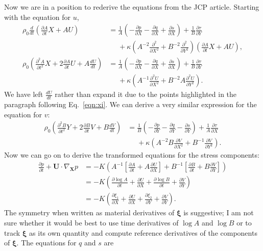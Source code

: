 \documentclass[11pt]{article}
\newcommand{\p}{\partial}
\newcommand{\bxi}{\boldsymbol\xi}
\newcommand{\bU}{\mathbf{U}}
\newcommand{\bX}{\mathbf{X}}
\begin{document}
Now we are in a position to rederive the equations from the JCP article. Starting with the equation for $u$,
\begin{align}
  \rho_0 \frac{d}{dt}\left(\frac{\p A}{\p t}X + A U\right) &= \frac{1}{A}\left(-\frac{\p p}{\p X} - \frac{\p q}{\p X} + \frac{\p s}{\p X} \right) + \frac{1}{B}\frac{\p \tau}{\p Y} \nonumber \\
    &\phantom{=} + \kappa\left(A^{-2}\frac{\p^2}{\p X^2} + B^{-2}\frac{\p^2}{\p Y^2}\right)\left(\frac{\p A}{\p t} X + A U\right), \label{eqn:u}\\
    \rho_0 \left(\frac{\p^2 A}{\p t^2}X + 2\frac{\p A}{\p t}U + A\frac{d U}{dt}\right) &= \frac{1}{A}\left(-\frac{\p p}{\p X} - \frac{\p q}{\p X} + \frac{\p s}{\p X} \right) + \frac{1}{B}\frac{\p \tau}{\p Y} \nonumber \\
    &\phantom{=} + \kappa\left(A^{-1}\frac{\p^2 U}{\p X^2} + B^{-2}A\frac{\p^2 U}{\p Y^2}\right).
\end{align}
We have left $\frac{d U}{dt}$ rather than expand it due to the points highlighted in the paragraph following Eq.~\ref{eqn:xi}. We can derive a very similar expression for the equation for $v$:
\begin{align}
  \rho_0 \left(\frac{\p^2 B}{\p t^2}Y + 2\frac{\p B}{\p t}V + B\frac{d V}{dt}\right) &= \frac{1}{B}\left(-\frac{\p p}{\p Y} - \frac{\p q}{\p Y} - \frac{\p s}{\p Y}\right) + \frac{1}{A}\frac{\p \tau}{\p X} \nonumber \\
    &\phantom{=} + \kappa \left(A^{-2}B\frac{\p V}{\p X^2} + B^{-1}\frac{\p V}{\p Y^2}\right). \label{eqn:v}
\end{align}
Now we can go on to derive the transformed equations for the stress components:
\begin{align}
    \frac{\p p}{\p t} + \bU\cdot\nabla_\bX p &= -K\left(A^{-1}\left[\frac{\p A}{\p t} + A\frac{\p U}{\p X}\right] + B^{-1}\left[\frac{\p B}{\p t} + B\frac{\p V}{\p Y}\right]\right)\nonumber\\
    &= -K \left(\frac{\p \log A}{\p t} + \frac{\p U}{\p X} + \frac{\p \log B}{\p t} + \frac{\p V}{\p Y}\right)\nonumber\\
    &= -K \left(\frac{\p \xi_1}{\p X} + \frac{\p U}{\p X} + \frac{\p \xi_2}{\p Y} + \frac{\p V}{\p Y}\right).
    \label{eqn:p}
\end{align}
The symmetry when written as material derivatives of $\bxi$ is suggestive; I am not sure whether it would be best to use time derivatives of $\log A$ and $\log B$ or to track $\bxi$ as its own quantity and compute reference derivatives of the components of $\bxi$. The equations for $q$ and $s$ are
\end{document}

